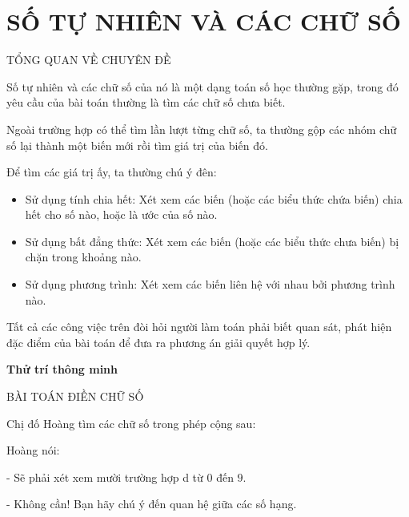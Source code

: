 \section{SỐ TỰ NHIÊN VÀ CÁC CHỮ SỐ}
\begin{center}
TỔNG QUAN VỀ CHUYÊN ĐỀ
\end{center}

Số tự nhiên và các chữ số của nó là một dạng toán số học thường gặp, trong đó yêu cầu của bài toán thường là tìm các chữ số chưa biết.

Ngoài trường hợp có thể tìm lần lượt từng chữ số, ta thường gộp các nhóm chữ số lại thành một biến mới rồi tìm giá trị của biến đó.

Để tìm các giá trị ấy, ta thường chú ý đên:
\begin{itemize}
\item Sử dụng tính chia hết: Xét xem các biến (hoặc các biểu thức chứa biến) chia hết cho số nào, hoặc là ước của số nào.
\item Sử dụng bất đẳng thức: Xét xem các biến (hoặc các biểu thức chưa biến) bị chặn trong khoảng nào.
\item Sử dụng phương trình: Xét xem các biến liên hệ với nhau bởi phương trình nào.
\end{itemize}

Tất cả các công việc trên đòi hỏi người làm toán phải biết quan sát, phát hiện đặc điểm của bài toán để đưa ra phương án giải quyết hợp lý.

\textbf{Thử trí thông minh}
\begin{center}
BÀI TOÁN ĐIỀN CHỮ SỐ
\end{center}

Chị đố Hoàng tìm các chữ số trong phép cộng sau:
\begin{center}
\end{center}

Hoàng nói:

- Sẽ phải xét xem mười trường hợp d từ $0$ đến $9$.

- Không cần! Bạn hãy chú ý đến quan hệ giữa các số hạng.

